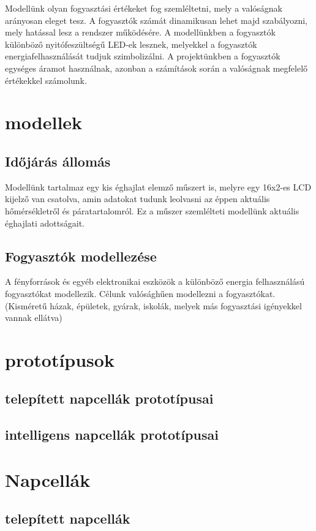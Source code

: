 \documentclass[
]{thesis-ekf}
\theoremstyle{definition}
\theoremstyle{remark}
\begin{document}
		Modellünk olyan fogyasztási értékeket fog szemléltetni, mely a valóságnak arányosan eleget tesz. A fogyasztók számát dinamikusan lehet majd szabályozni, mely hatással lesz a rendszer működésére. A modellünkben a fogyasztók különböző nyitófeszültségű LED-ek lesznek, melyekkel a fogyasztók energiafelhasználását tudjuk szimbolizálni. A projektünkben a fogyasztók egységes áramot használnak, azonban a számítások során a valóságnak megfelelő értékekkel számolunk.
		
	\section{modellek}
		\subsection{Időjárás állomás}
			\par Modellünk tartalmaz egy kis éghajlat elemző műszert is, melyre egy 16x2-es LCD kijelző van csatolva, amin adatokat tudunk leolvasni az éppen aktuális hőmérsékletről és páratartalomról. Ez a műszer szemlélteti modellünk aktuális éghajlati adottságait.
		\subsection{Fogyasztók modellezése}
			\par A fényforrások és egyéb elektronikai eszközök a különböző energia felhasználású fogyasztókat modellezik. Célunk valósághűen modellezni a fogyasztókat. (Kisméretű házak, épületek, gyárak, iskolák, melyek más fogyasztási igényekkel vannak ellátva)
			
	\section{prototípusok}
		\subsection{telepített napcellák prototípusai}
		\subsection{intelligens napcellák prototípusai}
 	\section{Napcellák}
 		\subsection{telepített napcellák}
\end{document}
